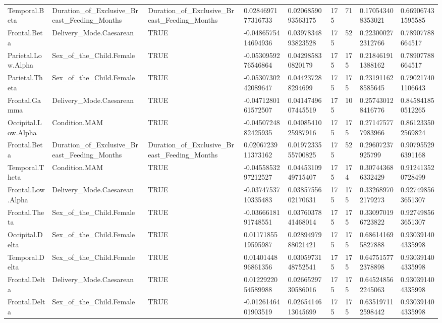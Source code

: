 \begin{longtable}{lllllllll}
Temporal.Beta & Duration\_of\_Exclusive\_Breast\_Feeding\_Months & Duration\_of\_Exclusive\_Breast\_Feeding\_Months & 0.0284697177316733 & 0.0206859093563175 & 175 & 71 & 0.170543408353021 & 0.669067431595585 \\
Frontal.Beta & Delivery\_Mode.Caesarean & TRUE & -0.0486575414694936 & 0.0397834893823528 & 175 & 52 & 0.223000272312766 & 0.78907788664517 \\
Parietal.Low.Alpha & Sex\_of\_the\_Child.Female & TRUE & -0.0530959276546864 & 0.042985830820179 & 175 & 175 & 0.218461911388162 & 0.78907788664517 \\
Parietal.Theta & Sex\_of\_the\_Child.Female & TRUE & -0.0530730242089647 & 0.044237288294699 & 175 & 175 & 0.231911628585645 & 0.790217401106643 \\
Frontal.Gamma & Delivery\_Mode.Caesarean & TRUE & -0.0471280161572507 & 0.0414749607445519 & 175 & 10 & 0.257430128416776 & 0.845841850512265 \\
Occipital.Low.Alpha & Condition.MAM & TRUE & -0.0450724882425935 & 0.0408541025987916 & 175 & 175 & 0.271475777983966 & 0.861233502569824 \\
Frontal.Beta & Duration\_of\_Exclusive\_Breast\_Feeding\_Months & Duration\_of\_Exclusive\_Breast\_Feeding\_Months & 0.0206723911373162 & 0.0197233555700825 & 175 & 52 & 0.29607237925799 & 0.907955296391168 \\
Temporal.Theta & Condition.MAM & TRUE & -0.0455853297212527 & 0.0445310949715407 & 175 & 174 & 0.307443686332429 & 0.912413520728499 \\
Frontal.Low.Alpha & Delivery\_Mode.Caesarean & TRUE & -0.0374753710335483 & 0.0385755602170631 & 175 & 175 & 0.332689702179273 & 0.927498563651307 \\
Frontal.Theta & Sex\_of\_the\_Child.Female & TRUE & -0.0366618191748551 & 0.0376037841468014 & 175 & 175 & 0.330970196723822 & 0.927498563651307 \\
Occipital.Delta & Sex\_of\_the\_Child.Female & TRUE & 0.0117185519595987 & 0.0289497988021421 & 175 & 175 & 0.686141695827888 & 0.930391404335998 \\
Temporal.Delta & Sex\_of\_the\_Child.Female & TRUE & 0.0140144896861356 & 0.0305973148752541 & 175 & 175 & 0.647515772378898 & 0.930391404335998 \\
Frontal.Delta & Delivery\_Mode.Caesarean & TRUE & 0.0122922054589988 & 0.0266529730586016 & 175 & 175 & 0.645248562245063 & 0.930391404335998 \\
Frontal.Delta & Sex\_of\_the\_Child.Female & TRUE & -0.0126146401903519 & 0.0265414613045699 & 175 & 175 & 0.635197112598442 & 0.930391404335998 \\

\end{longtable}
